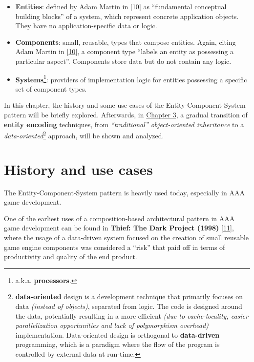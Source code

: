 \documentclass[twoside, 12pt, a4paper, openright]{book}
\begin{document}
\begin{itemize}
\item
  \textbf{Entities}: defined by Adam Martin in
  {[}\protect\hyperlink{ref-tmachine_esmmogfuturep2_2007}{10}{]} as
  ``fundamental conceptual building blocks'' of a system, which
  represent concrete application objects. They have no
  application-specific data or logic.
\item
  \textbf{Components}: small, reusable, types that compose entities.
  Again, citing Adam Martin in
  {[}\protect\hyperlink{ref-tmachine_esmmogfuturep2_2007}{10}{]}, a
  component type ``labels an entity as possessing a particular aspect''.
  Components store data but do not contain any logic.
\item
  \textbf{Systems}\footnote{a.k.a. \textbf{processors}.}: providers of
  implementation logic for entities possessing a specific set of
  component types.
\end{itemize}

In this chapter, the history and some use-cases of the
Entity-Component-System pattern will be briefly explored. Afterwards, in
\protect\hyperlink{chapter_encoding_entities}{Chapter 3}, a gradual
transition of \textbf{entity encoding} techniques, from
\emph{``traditional'' object-oriented inheritance} to a
\emph{data-oriented}\footnote{\textbf{data-oriented} design is a
  development technique that primarily focuses on data \emph{(instead of
  objects)}, separated from logic. The code is designed around the data,
  potentially resulting in a more efficient \emph{(due to
  cache-locality, easier parallelization opportunities and lack of
  polymorphism overhead)} implementation. Data-oriented design is
  orthogonal to \textbf{data-driven} programming, which is a paradigm
  where the flow of the program is controlled by external data at
  run-time.} approach, will be shown and analyzed.

\section{History and use cases}\label{history-and-use-cases}

The Entity-Component-System pattern is heavily used today, especially in
AAA game development.

One of the earliest uses of a composition-based architectural pattern in
AAA game development can be found in \textbf{Thief: The Dark Project
(1998)}
{[}\protect\hyperlink{ref-tomleonard_thiefpostmortem_1999}{11}{]}, where
the usage of a data-driven system focused on the creation of small
reusable game engine components was considered a ``risk'' that paid off
in terms of productivity and quality of the end product.
\end{document}
